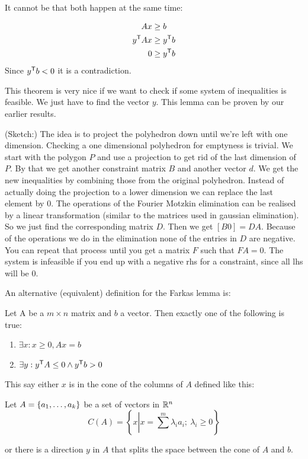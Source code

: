 It cannot be that both happen at the same time:

\begin{align*}
Ax &\geq b\\
{y}^\text{\upshape \sffamily T} Ax&\geq {y}^\text{\upshape \sffamily T} b\\
0 &\geq {y}^\text{\upshape \sffamily T} b
\end{align*}
Since ${y}^\text{\upshape \sffamily T} b<0$ it is a contradiction.

This theorem is very nice if we want to check if some system of inequalities is feasible. We just have to find the vector $y$. This lemma can be proven by our earlier results. 

(Sketch:) The idea is to project the polyhedron down until we're left with one dimension. Checking a one dimensional polyhedron for emptyness is trivial. We start with the polygon $P$ and use a projection to get rid of the last dimension of $P$. By that we get another constraint matrix $B$ and another vector $d$. We get the new inequalities by combining those from the original polyhedron. Instead of actually doing the projection to a lower dimension we can replace the last element by 0. The operations of the Fourier Motzkin elimination can be realised by a linear transformation (similar to the matrices used in gaussian elimination). So we just find the corresponding matrix $D$. Then we get $[B0]=DA$. Because of the operations we do in the elimination none of the entries in $D$ are negative.
You can repeat that process until you get a matrix $F$ such that $FA=0$. The system is infeasible if you end up with a negative rhs for a constraint, since all lhs will be 0.

An alternative (equivalent) definition for the Farkas lemma is:

\begin{thm} Let A be a $m\times n$ matrix and $b$ a vector. Then exactly one of the following is true:
\begin{enumerate}
\item $\exists x: x\geq 0, Ax = b$
\item $\exists y: {y}^\text{\upshape \sffamily T} A \leq 0 \wedge {y}^\text{\upshape \sffamily T} b>0$
\end{enumerate}
\end{thm}

This say either $x$ is in the cone of the columns of $A$ defined like this:

\begin{Def}[Cone] Let $A=\{{a}_1,\ldots,{a}_{k}\}$ be a set of vectors in $\mathbb{R}^n$
\[C(A)=\left\{x\left|x=\sum^m \lambda_i a_i;\ \lambda_i \geq 0\right.\right\}\]
\end{Def}

or there is a direction $y$ in $A$ that splits the space between the cone of $A$ and $b$.